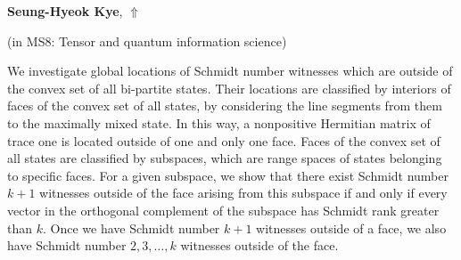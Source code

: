\documentclass[ILAS2025-program.tex]{subfiles}
\begin{document}
\hypertarget{down0252}{}\begin{ilasabstract}
    
\textbf{Seung-Hyeok Kye},  \hfill \hyperlink{up0252}{$\Uparrow$}
    
    
(in {\color{mstitle}MS8: Tensor and quantum information science})
        
\mtskip
    We investigate global locations of Schmidt number witnesses which
are outside of the convex set of all bi-partite states. Their
locations are classified by interiors of faces of the convex set of
all states, by considering the line segments from them to the
maximally mixed state. In this way, a nonpositive Hermitian matrix
of trace one is located outside of one and only one face. Faces of
the convex set of all states are classified by subspaces, which are
range spaces of states belonging to specific faces. For a given
subspace, we show that there exist Schmidt number $k+1$ witnesses
outside of the face arising from this subspace if and only if every
vector in the orthogonal complement of the subspace has Schmidt rank
greater than $k$. Once we have Schmidt number $k+1$ witnesses
outside of a face, we also have Schmidt number $2,3,\dots, k$
witnesses outside of the face.
\end{ilasabstract}
    
\end{document}

